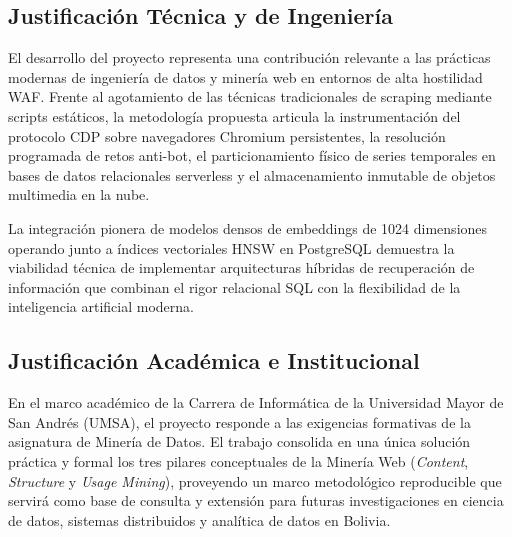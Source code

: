 \subsection{Justificación Técnica y de Ingeniería}
El desarrollo del proyecto representa una contribución relevante a las prácticas modernas de ingeniería de datos y minería web en entornos de alta hostilidad WAF. Frente al agotamiento de las técnicas tradicionales de scraping mediante scripts estáticos, la metodología propuesta articula la instrumentación del protocolo CDP sobre navegadores Chromium persistentes, la resolución programada de retos anti-bot, el particionamiento físico de series temporales en bases de datos relacionales serverless y el almacenamiento inmutable de objetos multimedia en la nube. 

La integración pionera de modelos densos de embeddings de 1024 dimensiones operando junto a índices vectoriales HNSW en PostgreSQL demuestra la viabilidad técnica de implementar arquitecturas híbridas de recuperación de información que combinan el rigor relacional SQL con la flexibilidad de la inteligencia artificial moderna.

\subsection{Justificación Académica e Institucional}
En el marco académico de la Carrera de Informática de la Universidad Mayor de San Andrés (UMSA), el proyecto responde a las exigencias formativas de la asignatura de Minería de Datos. El trabajo consolida en una única solución práctica y formal los tres pilares conceptuales de la Minería Web (\textit{Content}, \textit{Structure} y \textit{Usage Mining}), proveyendo un marco metodológico reproducible que servirá como base de consulta y extensión para futuras investigaciones en ciencia de datos, sistemas distribuidos y analítica de datos en Bolivia.
